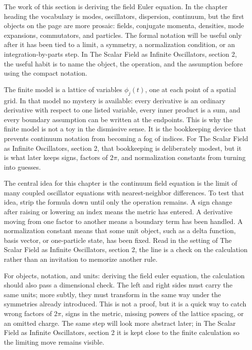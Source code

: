 The work of this section is deriving the field Euler equation.  In the chapter heading the vocabulary is modes, oscillators, dispersion, continuum, but the first objects on the page are more prosaic: fields, conjugate momenta, densities, mode expansions, commutators, and particles.  The formal notation will be useful only after it has been tied to a limit, a symmetry, a normalization condition, or an integration-by-parts step.  In The Scalar Field as Infinite Oscillators, section 2, the useful habit is to name the object, the operation, and the assumption before using the compact notation.

The finite model is a lattice of variables \(\phi_j(t)\), one at each point of a spatial grid.  In that model no mystery is available: every derivative is an ordinary derivative with respect to one listed variable, every inner product is a sum, and every boundary assumption can be written at the endpoints.  This is why the finite model is not a toy in the dismissive sense.  It is the bookkeeping device that prevents continuum notation from becoming a fog of indices.  For The Scalar Field as Infinite Oscillators, section 2, that bookkeeping is deliberately modest, but it is what later keeps signs, factors of \(2\pi\), and normalization constants from turning into guesses.

The central idea for this chapter is the continuum field equation is the limit of many coupled oscillator equations with nearest-neighbor differences.  To test that idea, strip the formula down until only the operation remains.  A sign change after raising or lowering an index means the metric has entered.  A derivative moving from one factor to another means a boundary term has been handled.  A normalization constant means that some unit object, such as a delta function, basis vector, or one-particle state, has been fixed.  Read in the setting of The Scalar Field as Infinite Oscillators, section 2, the line is a check on the calculation rather than an invitation to memorize another rule.

For objects, notation, and units: deriving the field euler equation, the calculation should also pass a dimensional check.  The left and right sides must carry the same units; more subtly, they must transform in the same way under the symmetries already introduced.  This is not a proof, but it is a quick way to catch wrong factors of \(2\pi\), signs in the metric, missing powers of the lattice spacing, or an omitted charge.  The same step will look more abstract later; in The Scalar Field as Infinite Oscillators, section 2 it is kept close to the finite calculation so the limiting move remains visible.

